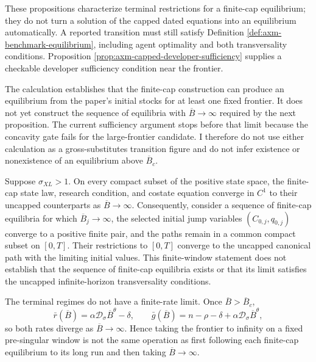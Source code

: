 These propositions characterize terminal restrictions for a finite-cap
equilibrium; they do not turn a solution of the capped dated equations into an
equilibrium automatically. A reported transition must still satisfy Definition
\ref{def:axm-benchmark-equilibrium}, including agent optimality and both
transversality conditions. Proposition
\ref{prop:axm-capped-developer-sufficiency} supplies a checkable developer
sufficiency condition near the frontier.

The calculation establishes that the finite-cap construction can produce an
equilibrium from the paper's initial stocks for at least one fixed frontier. It
does not yet construct the sequence of equilibria with
\(\overline B\to\infty\) required by the next proposition. The current
sufficiency argument stops before that limit because the concavity gate fails
for the large-frontier candidate. I therefore do not use either calculation as
a gross-substitutes transition figure and do not infer existence or
nonexistence of an equilibrium above \(\overline B_c\).

\begin{proposition}
\label{prop:axm-infinite-frontier-limit}
Suppose \(\sigma_{XL}>1\). On every compact subset of the positive state
space, the finite-cap state law, research condition, and costate equation
converge in \(C^1\) to their uncapped counterparts as
\(\overline B\to\infty\). Consequently, consider a sequence of finite-cap
equilibria for which \(\overline B_j\to\infty\), the selected initial jump
variables \((C_{0,j},q_{0,j})\) converge to a positive finite pair, and the
paths remain in a common compact subset on \([0,T]\). Their restrictions to
\([0,T]\) converge to the uncapped canonical path with the limiting initial
values. This finite-window statement does not establish that the sequence of
finite-cap equilibria exists or that its limit satisfies the uncapped
infinite-horizon transversality conditions.

The terminal regimes do not have a finite-rate limit. Once
\(\overline B>\overline B_c\),
\begin{equation}
 \bar r(\overline B)
 =\alpha\mathcal D_\sigma\overline B^\theta-\delta,\qquad
 \bar g(\overline B)
 =n-\rho-\delta+\alpha\mathcal D_\sigma\overline B^\theta,
 \label{eq:axm-capped-diverging-rates}
\end{equation}
so both rates diverge as \(\overline B\to\infty\). Hence taking the frontier
to infinity on a fixed pre-singular window is not the same operation as first
following each finite-cap equilibrium to its long run and then taking
\(\overline B\to\infty\).
\end{proposition}

